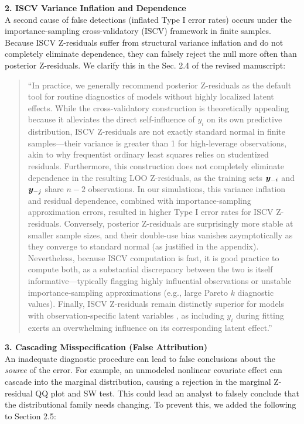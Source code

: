 \documentclass[11pt]{article}
\begin{document}
\textbf{2. ISCV Variance Inflation and Dependence} \\
A second cause of false detections (inflated Type I error rates) occurs under the importance-sampling cross-validatory (ISCV) framework in finite samples. Because ISCV Z-residuals suffer from structural variance inflation and do not completely eliminate dependence, they can falsely reject the null more often than posterior Z-residuals. We clarify this in the Sec. 2.4 of the revised manuscript:

\begin{quote}
``In practice, we generally recommend posterior Z-residuals as the default tool for routine diagnostics of models without highly localized latent effects. While the cross-validatory construction is theoretically appealing because it alleviates the direct self-influence of $y_i$ on its own predictive distribution, ISCV Z-residuals are not exactly standard normal in finite samples—their variance is greater than 1 for high-leverage observations, akin to why frequentist ordinary least squares relies on studentized residuals. Furthermore, this construction does not completely eliminate dependence in the resulting LOO Z-residuals, as the training sets $\bm{y}_{-i}$ and $\bm{y}_{-j}$ share $n-2$ observations. In our simulations, this variance inflation and residual dependence, combined with importance-sampling approximation errors, resulted in higher Type I error rates for ISCV Z-residuals. Conversely, posterior Z-residuals are surprisingly more stable at smaller sample sizes, and their double-use bias vanishes asymptotically as they converge to standard normal (as justified in the appendix). Nevertheless, because ISCV computation is fast, it is good practice to compute both, as a substantial discrepancy between the two is itself informative—typically flagging highly influential observations or unstable importance-sampling approximations (e.g., large Pareto $k$ diagnostic values). Finally, ISCV Z-residuals remain distinctly superior for models with observation-specific latent variables \citep{Li2016,Millar2018}, as including $y_i$ during fitting exerts an overwhelming influence on its corresponding latent effect.''
\end{quote}

\textbf{3. Cascading Misspecification (False Attribution)} \\
An inadequate diagnostic procedure can lead to false conclusions about the \textit{source} of the error. For example, an unmodeled nonlinear covariate effect can cascade into the marginal distribution, causing a rejection in the marginal Z-residual QQ plot and SW test. This could lead an analyst to falsely conclude that the distributional family needs changing. To prevent this, we added the following to Section 2.5:
\end{document}
